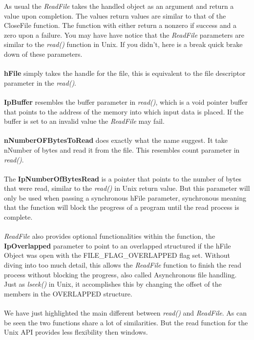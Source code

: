 \documentclass[a4paper]{article}
\begin{document}
As usual the \textit{ReadFile} takes the handled object as an argument and return a value upon completion. The values return values are similar to that of the CloseFile function. The function with either return a nonzero if success and a zero upon a failure. You may have have notice that the \textit{ReadFile} parameters are similar to the \textit{read()} function in Unix. If you didn’t, here is a break quick brake down of these parameters.\\
\\
\textbf{hFile} simply takes the handle for the file, this is equivalent to the file descriptor parameter in the \textit{read()}.\\
\\
\textbf{IpBuffer} resembles the buffer parameter in \textit{read()}, which is a void pointer buffer that points to the address of the memory into which input data is placed.  If the buffer is set to an invalid value the \textit{ReadFile} may fail.\\
\\
\textbf{nNumberOFBytesToRead} does exactly what the name suggest. It take nNumber of bytes and read it from the file. This resembles count parameter in \textit{read()}.\\
\\
The \textbf{IpNumberOfBytesRead} is a pointer that points to the number of bytes that were read, similar to the \textit{read()} in Unix return value. But this parameter will only be used when passing a synchronous hFile parameter, synchronous meaning that the function will block the progress of a program until the read process is complete.\\
\\
\textit{ReadFile} also provides optional functionalities within the function, the \textbf{IpOverlapped} parameter to point to an overlapped structured if the hFile Object was open with the FILE\_FLAG\_OVERLAPPED flag set. Without diving into too much detail, this allows the \textit{ReadFile} function to finish the read process without blocking the progress, also called Asynchronous file handling. Just as \textit{lseek()} in Unix, it accomplishes this by changing the offset of the members in the OVERLAPPED structure.  \\
\\
We have just highlighted the main different between \textit{read()} and \textit{ReadFile}. As can be seen the two functions share a lot of similarities. But the read function for the Unix API provides less flexibility then windows.
\end{document}
